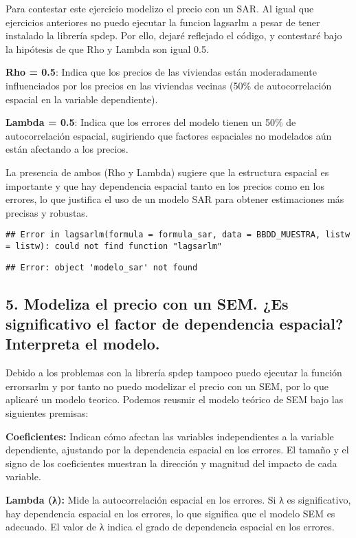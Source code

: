 \documentclass[
]{article}
\begin{document}
Para contestar este ejercicio modelizo el precio con un SAR. Al igual
que ejercicios anteriores no puedo ejecutar la funcion lagsarlm a pesar
de tener instalado la librería spdep. Por ello, dejaré reflejado el
código, y contestaré bajo la hipótesis de que Rho y Lambda son igual
0.5.

\textbf{Rho = 0.5}: Indica que los precios de las viviendas están
moderadamente influenciados por los precios en las viviendas vecinas
(50\% de autocorrelación espacial en la variable dependiente).

\textbf{Lambda = 0.5}: Indica que los errores del modelo tienen un 50\%
de autocorrelación espacial, sugiriendo que factores espaciales no
modelados aún están afectando a los precios.

La presencia de ambos (Rho y Lambda) sugiere que la estructura espacial
es importante y que hay dependencia espacial tanto en los precios como
en los errores, lo que justifica el uso de un modelo SAR para obtener
estimaciones más precisas y robustas.

\begin{verbatim}
## Error in lagsarlm(formula = formula_sar, data = BBDD_MUESTRA, listw = listw): could not find function "lagsarlm"
\end{verbatim}

\begin{verbatim}
## Error: object 'modelo_sar' not found
\end{verbatim}

\subsection{5. Modeliza el precio con un SEM. ¿Es significativo el
factor de dependencia espacial? Interpreta el
modelo.}\label{modeliza-el-precio-con-un-sem.-es-significativo-el-factor-de-dependencia-espacial-interpreta-el-modelo.}

Debido a los problemas con la librería spdep tampoco puedo ejecutar la
función errorsarlm y por tanto no puedo modelizar el precio con un SEM,
por lo que aplicaré un modelo teorico. Podemos reusmir el modelo teórico
de SEM bajo las siguientes premisas:

\textbf{Coeficientes:} Indican cómo afectan las variables independientes
a la variable dependiente, ajustando por la dependencia espacial en los
errores. El tamaño y el signo de los coeficientes muestran la dirección
y magnitud del impacto de cada variable.

\textbf{Lambda (λ):} Mide la autocorrelación espacial en los errores. Si
λ es significativo, hay dependencia espacial en los errores, lo que
significa que el modelo SEM es adecuado. El valor de λ indica el grado
de dependencia espacial en los errores.
\end{document}
